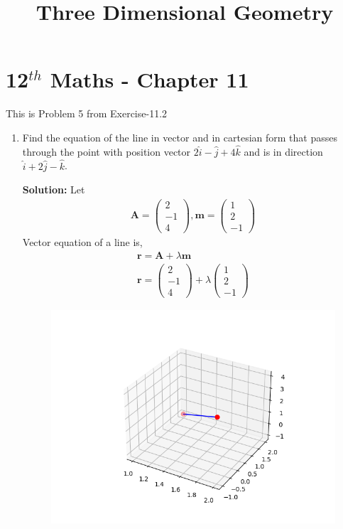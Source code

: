 \documentclass[10pt]{article}
\newcommand{\solution}{\noindent \textbf{Solution: }}
\newcommand{\myvec}[1]{\ensuremath{\begin{pmatrix}#1\end{pmatrix}}}
\let\vec\mathbf{}
\begin{document}
\begin{center}
\title{\textbf{Three Dimensional Geometry}}
\date{\vspace{-5ex}} %
\maketitle
\end{center}
\section{12$^{th}$ Maths - Chapter 11}
This is Problem 5 from Exercise-11.2
\begin{enumerate}
\item Find the equation of the line in vector and in cartesian form that passes through the point with position vector $2\hat{i}-\hat{j}+4\hat{k}$ and is in direction $\hat{i}+2\hat{j}-\hat{k}$.

\solution
Let
\begin{align}
\vec{A}=\myvec{2\\-1\\4},\vec{m}=\myvec{1\\2\\-1}
\end{align}
Vector equation of a line is,
\begin{align}
\vec{r}=\vec{A}+\lambda\vec{m}\\
\vec{r}=\myvec{2\\-1\\4}+\lambda\myvec{1\\2\\-1}
\end{align}
\begin{figure}[h!]
	\begin{center}
		\includegraphics[width=\columnwidth]{./figs/fig.png}
	\end{center}
\caption{}
\label{fig:Fig1}
\end{figure}
\end{enumerate}
\end{document}
